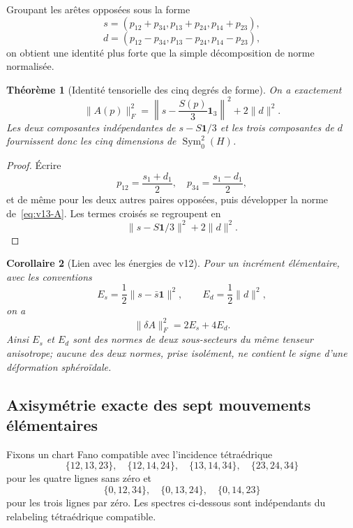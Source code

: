 \documentclass[11pt,a4paper]{article}
\newtheorem{theorem}{Théorème}[section]
\newtheorem{corollary}[theorem]{Corollaire}
\begin{document}
Groupant les arêtes opposées sous la forme
\[
 s=(p_{12}+p_{34},p_{13}+p_{24},p_{14}+p_{23}),
\]
\[
 d=(p_{12}-p_{34},p_{13}-p_{24},p_{14}-p_{23}),
\]
on obtient une identité plus forte que la simple décomposition de norme normalisée.

\begin{theorem}[Identité tensorielle des cinq degrés de forme]\label{thm:v13-five-dof}
On a exactement
\begin{equation}\label{eq:v13-five-dof}
 \boxed{
 \|A(p)\|_F^2
 =
 \left\|s-\frac{S(p)}3\mathbf1_3\right\|^2
 +
 2\|d\|^2.}
\end{equation}
Les deux composantes indépendantes de $s-S\mathbf1/3$ et les trois composantes de $d$ fournissent donc les cinq dimensions de $\operatorname{Sym}_0^2(H)$.
\end{theorem}

\begin{proof}
Écrire
\[
 p_{12}=\frac{s_1+d_1}{2},\quad
 p_{34}=\frac{s_1-d_1}{2},
\]
et de même pour les deux autres paires opposées, puis développer la norme de~\eqref{eq:v13-A}. Les termes croisés se regroupent en
\[
 \|s-S\mathbf1/3\|^2+2\|d\|^2.
\]
\end{proof}

\begin{corollary}[Lien avec les énergies de v12]\label{cor:v13-energy-norm}
Pour un incrément élémentaire, avec les conventions
\[
 E_s=\frac12\|s-\bar s\mathbf1\|^2,
 \qquad
 E_d=\frac12\|d\|^2,
\]
on a
\begin{equation}\label{eq:v13-energy-norm}
 \boxed{
 \|\delta A\|_F^2
 =
 2E_s+4E_d.}
\end{equation}
Ainsi $E_s$ et $E_d$ sont des normes de deux sous-secteurs du même tenseur anisotrope; aucune des deux normes, prise isolément, ne contient le signe d'une déformation sphéroïdale.
\end{corollary}

\subsection{Axisymétrie exacte des sept mouvements élémentaires}

Fixons un chart Fano compatible avec l'incidence tétraédrique
\[
 \{12,13,23\},\quad
 \{12,14,24\},\quad
 \{13,14,34\},\quad
 \{23,24,34\}
\]
pour les quatre lignes sans zéro et
\[
 \{0,12,34\},\quad
 \{0,13,24\},\quad
 \{0,14,23\}
\]
pour les trois lignes par zéro. Les spectres ci-dessous sont indépendants du relabeling tétraédrique compatible.
\end{document}
